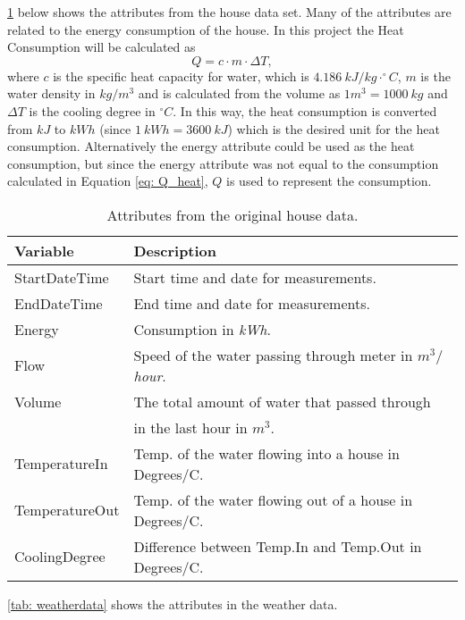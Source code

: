 \noindent \cref{tab: housedata} below shows the attributes from the house data set. Many of the attributes are related to the energy consumption of the house. In this project the  Heat Consumption will be calculated as
\begin{equation}
    Q = c\cdot m \cdot \Delta T,
    \label{eq: Q_heat}
\end{equation}
where $c$ is the specific heat capacity for water, which is $4.186 \ kJ/kg\cdot ^{\circ}C$, $m$ is the water density in $kg/m^3$ and is calculated from the volume as $1m^3 = 1000 \ kg$ and $\Delta T$ is the cooling degree in $^{\circ}C$. In this way, the heat consumption is converted from $kJ$ to $kWh$ (since $1 \ kWh = 3600 \ kJ$) which is the desired unit for the heat consumption. Alternatively the energy attribute could be used as the heat consumption, but since the energy attribute was not equal to the consumption calculated in Equation \ref{eq: Q_heat}, $Q$ is used to represent the consumption.
\begin{table}[H]
    \centering
    \begin{tabular}{ll}
     \hline
     \textbf{Variable} & \textbf{Description} \\
    \hline
    \hline
    StartDateTime  &  Start time and date for measurements.\\
    EndDateTime  &  End time and date for measurements.\\
    Energy  &  Consumption in \textit{kWh}.\\
    Flow  &  Speed of the water passing through meter in \textit{$m^3/$hour}.\\
    Volume & The total amount of water that passed through\\ &in the last hour in $m^3$.\\
    TemperatureIn  &  Temp. of the water flowing into a house in Degrees/C. \\
    TemperatureOut  & Temp. of the water flowing out of a house in Degrees/C.\\
    CoolingDegree  &  Difference between Temp.In and Temp.Out in Degrees/C. \\
    \hline
    \end{tabular}
    \caption{Attributes from the original house data.}
    \label{tab: housedata}
\end{table}
\noindent \cref{tab: weatherdata} shows the attributes in the weather data.
